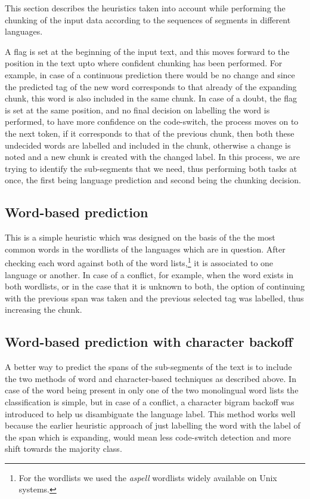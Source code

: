 \documentclass[11pt]{article}
\begin{document}
This section describes the heuristics taken into account while performing the chunking of the input data according to 
the sequences of segments in different languages.

A flag is set at the beginning of the input text, and this moves forward to the position in the text upto where confident 
chunking has been performed. For example, in case of a continuous prediction there would be no change and since the 
predicted tag of the new word corresponds to that already of the expanding chunk, this word is also included in the 
same chunk. In case of a doubt, the flag is set at the same position, and no final decision on labelling the word is 
performed, to have more confidence on the code-switch, the process moves on to the next token, if it corresponds to 
that of the previous chunk, then both these undecided words are labelled and included in the chunk, otherwise a change 
is noted and a new chunk is created with the changed label. In this process, we are trying to identify the sub-segments 
that we need, thus performing both tasks at once, the first being language prediction and second being the chunking decision. 

\subsection{Word-based prediction}
\label{wbased}

This is a simple heuristic which was designed on the basis of the the most common words in the wordlists of the languages 
which are in question. After checking each word against both of the word lists,\footnote{For the wordlists we used the \emph{aspell}
wordlists widely available on Unix systems.} it is associated to one language or another. In 
case of a conflict, for example, when the word exists in both wordlists, or in the case that it is unknown to both, the option 
of continuing with the previous span was taken and the previous selected tag was labelled, thus increasing the chunk. 

\subsection{Word-based prediction with character backoff}
\label{wbasedbackoff}

A better way to predict the spans of the sub-segments of the text is to include the two methods of word and character-based techniques 
as described above. In case of the word being present in only one of the two monolingual word lists the classification is simple, 
but in case of a conflict, a character bigram backoff was introduced to help us disambiguate the language label. This method works well because the earlier heuristic approach of just labelling the word with the label of the span which is expanding, would mean less code-switch detection and more shift towards the majority class. 
\end{document}
